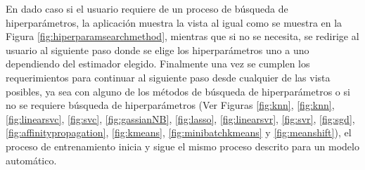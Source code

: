 En dado caso si el usuario requiere de un proceso de búsqueda de hiperparámetros, la aplicación muestra la vista al igual como se muestra en la Figura \ref{fig:hiperparamsearchmethod}, mientras que si no se necesita, se redirige al usuario al siguiente paso donde se elige los hiperparámetros uno a uno dependiendo del estimador elegido. Finalmente una vez se cumplen los requerimientos para continuar al siguiente paso desde cualquier de las vista posibles, ya sea con alguno de los métodos de búsqueda de hiperparámetros o si no se requiere búsqueda de hiperparámetros (Ver Figuras \ref{fig:knn}, \ref{fig:knn}, \ref{fig:linearsvc}, \ref{fig:svc}, \ref{fig:gassianNB}, \ref{fig:lasso}, \ref{fig:linearsvr}, \ref{fig:svr}, \ref{fig:sgd}, \ref{fig:affinitypropagation}, \ref{fig:kmeans}, \ref{fig:minibatchkmeans} y \ref{fig:meanshift}), el proceso de entrenamiento inicia y sigue el mismo proceso descrito para un modelo automático.
